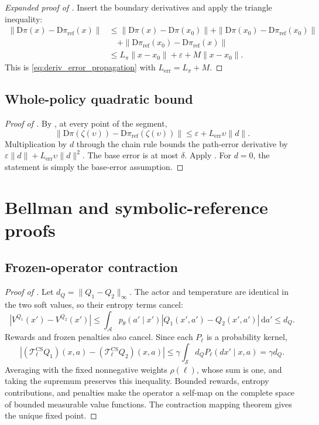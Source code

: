 \begin{proof}[Expanded proof of ]
Insert the boundary derivatives and apply the triangle inequality:
\[
\begin{aligned}
\|\mathrm D\pi(x)-\mathrm D\pi_{\mathrm{ref}}(x)\|
&\leq \|\mathrm D\pi(x)-\mathrm D\pi(x_0)\|
+\|\mathrm D\pi(x_0)-\mathrm D\pi_{\mathrm{ref}}(x_0)\|\\
&\quad+\|\mathrm D\pi_{\mathrm{ref}}(x_0)-\mathrm D\pi_{\mathrm{ref}}(x)\|\\
&\leq L_\pi\|x-x_0\|+\varepsilon+M\|x-x_0\|.
\end{aligned}
\]
This is \eqref{eq:deriv_error_propagation} with
\(L_{\mathrm{err}}=L_\pi+M\).
\end{proof}

\subsection{Whole-policy quadratic bound}
\label{app:proof_main}

\begin{proof}[Proof of ]
By , at every point of the segment,
\[
\|\mathrm{D}\pi(\zeta(\upsilon))
-\mathrm{D}\pi_{\mathrm{ref}}(\zeta(\upsilon))\|
\leq\varepsilon+L_{\mathrm{err}}\upsilon\|d\|.
\]
Multiplication by \(d\) through the chain rule bounds the path-error derivative by
\(\varepsilon\|d\|+L_{\mathrm{err}}\upsilon\|d\|^2\).
The base error is at most \(\delta\). Apply .
For \(d=0\), the statement is simply the base-error assumption.
\end{proof}

\section{Bellman and symbolic-reference proofs}

\subsection{Frozen-operator contraction}
\label{app:proof_contraction}

\begin{proof}[Proof of ]
Let \(d_Q=\|Q_1-Q_2\|_\infty\). The actor and temperature are identical in the two soft values, so their entropy terms cancel:
\[
|V^{Q_1}(x')-V^{Q_2}(x')|
\leq\int_{\mathcal A}p_\theta(a'\mid x')
|Q_1(x',a')-Q_2(x',a')|\,\mathrm d a'\leq d_Q.
\]
Rewards and frozen penalties also cancel. Since each \(P_\ell\) is a probability kernel,
\[
|(\mathcal T^{\mathrm{CS}}_\ell Q_1)(x,a)
-(\mathcal T^{\mathrm{CS}}_\ell Q_2)(x,a)|
\leq\gamma\int_{\mathcal S}d_Q P_\ell(dx'\mid x,a)=\gamma d_Q.
\]
Averaging with the fixed nonnegative weights \(\rho(\ell)\), whose sum is one, and taking the supremum preserves this inequality. Bounded rewards, entropy contributions, and penalties make the operator a self-map on the complete space of bounded measurable value functions. The contraction mapping theorem gives the unique fixed point.
\end{proof}

